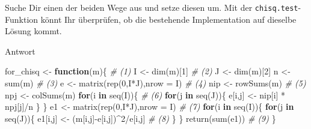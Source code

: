 \documentclass[
]{book}
\newenvironment{Shaded}{\begin{snugshade}}{\end{snugshade}}
\newcommand{\AttributeTok}[1]{\textcolor[rgb]{0.77,0.63,0.00}{#1}}
\newcommand{\CommentTok}[1]{\textcolor[rgb]{0.56,0.35,0.01}{\textit{#1}}}
\newcommand{\ControlFlowTok}[1]{\textcolor[rgb]{0.13,0.29,0.53}{\textbf{#1}}}
\newcommand{\DecValTok}[1]{\textcolor[rgb]{0.00,0.00,0.81}{#1}}
\newcommand{\FunctionTok}[1]{\textcolor[rgb]{0.00,0.00,0.00}{#1}}
\newcommand{\NormalTok}[1]{#1}
\newcommand{\OtherTok}[1]{\textcolor[rgb]{0.56,0.35,0.01}{#1}}
\newcommand{\SpecialCharTok}[1]{\textcolor[rgb]{0.00,0.00,0.00}{#1}}
\begin{document}
Suche Dir einen der beiden Wege aus und setze diesen um.
Mit der \texttt{chisq.test}-Funktion könnt Ihr überprüfen, ob die bestehende Implementation auf dieselbe Lösung kommt.

Antwort

\begin{Shaded}
\begin{Highlighting}[]
\NormalTok{for\_chisq }\OtherTok{\textless{}{-}} \ControlFlowTok{function}\NormalTok{(m)\{                   }\CommentTok{\# (1)}
\NormalTok{  I }\OtherTok{\textless{}{-}} \FunctionTok{dim}\NormalTok{(m)[}\DecValTok{1}\NormalTok{]                            }\CommentTok{\# (2)}
\NormalTok{  J }\OtherTok{\textless{}{-}} \FunctionTok{dim}\NormalTok{(m)[}\DecValTok{2}\NormalTok{]}
\NormalTok{  n }\OtherTok{\textless{}{-}} \FunctionTok{sum}\NormalTok{(m)                               }\CommentTok{\# (3)}
\NormalTok{  e }\OtherTok{\textless{}{-}} \FunctionTok{matrix}\NormalTok{(}\FunctionTok{rep}\NormalTok{(}\DecValTok{0}\NormalTok{,I}\SpecialCharTok{*}\NormalTok{J),}\AttributeTok{nrow =}\NormalTok{ I)          }\CommentTok{\# (4)}
\NormalTok{  nip }\OtherTok{\textless{}{-}} \FunctionTok{rowSums}\NormalTok{(m)                         }\CommentTok{\# (5)}
\NormalTok{  npj }\OtherTok{\textless{}{-}} \FunctionTok{colSums}\NormalTok{(m)}
  \ControlFlowTok{for}\NormalTok{(i }\ControlFlowTok{in} \FunctionTok{seq}\NormalTok{(I))\{                         }\CommentTok{\# (6)}
    \ControlFlowTok{for}\NormalTok{(j }\ControlFlowTok{in} \FunctionTok{seq}\NormalTok{(J))\{}
\NormalTok{      e[i,j] }\OtherTok{\textless{}{-}}\NormalTok{ nip[i] }\SpecialCharTok{*}\NormalTok{ npj[j]}\SpecialCharTok{/}\NormalTok{n}
\NormalTok{    \}}
\NormalTok{  \}}
\NormalTok{  e1 }\OtherTok{\textless{}{-}} \FunctionTok{matrix}\NormalTok{(}\FunctionTok{rep}\NormalTok{(}\DecValTok{0}\NormalTok{,I}\SpecialCharTok{*}\NormalTok{J),}\AttributeTok{nrow =}\NormalTok{ I)         }\CommentTok{\# (7)}
  \ControlFlowTok{for}\NormalTok{(i }\ControlFlowTok{in} \FunctionTok{seq}\NormalTok{(I))\{}
    \ControlFlowTok{for}\NormalTok{(j }\ControlFlowTok{in} \FunctionTok{seq}\NormalTok{(J))\{}
\NormalTok{      e1[i,j] }\OtherTok{\textless{}{-}}\NormalTok{ (m[i,j]}\SpecialCharTok{{-}}\NormalTok{e[i,j])}\SpecialCharTok{\^{}}\DecValTok{2}\SpecialCharTok{/}\NormalTok{e[i,j]   }\CommentTok{\# (8)}
\NormalTok{    \}}
\NormalTok{  \}}
  \FunctionTok{return}\NormalTok{(}\FunctionTok{sum}\NormalTok{(e1))                           }\CommentTok{\# (9)}
\NormalTok{\}}
\end{Highlighting}
\end{Shaded}
\end{document}
